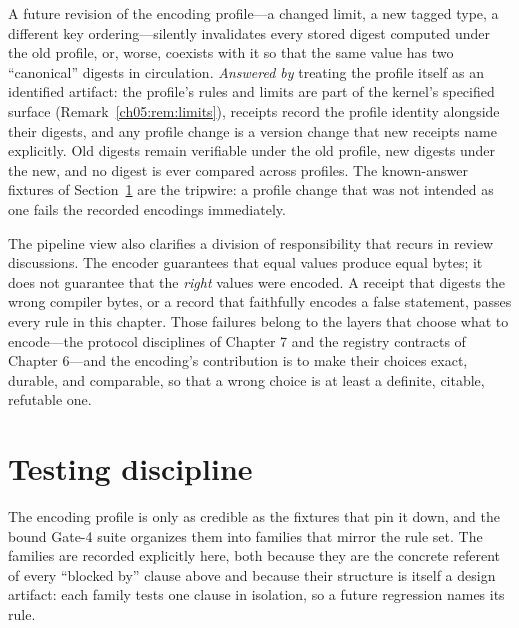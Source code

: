 \begin{threat}\label{ch05:threat:drift}
A future revision of the encoding profile---a changed limit, a new
tagged type, a different key ordering---silently invalidates every
stored digest computed under the old profile, or, worse, coexists with
it so that the same value has two ``canonical'' digests in circulation.
\emph{Answered by} treating the profile itself as an identified
artifact: the profile's rules and limits are part of the kernel's
specified surface (Remark~\ref{ch05:rem:limits}), receipts record the
profile identity alongside their digests, and any profile change is a
version change that new receipts name explicitly. Old digests remain
verifiable under the old profile, new digests under the new, and no
digest is ever compared across profiles. The known-answer fixtures of
Section~\ref{ch05:testing} are the tripwire: a profile change that was
not intended as one fails the recorded encodings immediately.
\end{threat}

The pipeline view also clarifies a division of responsibility that
recurs in review discussions. The encoder guarantees that equal values
produce equal bytes; it does not guarantee that the \emph{right} values
were encoded. A receipt that digests the wrong compiler bytes, or a
record that faithfully encodes a false statement, passes every rule in
this chapter. Those failures belong to the layers that choose what to
encode---the protocol disciplines of Chapter 7 and the registry
contracts of Chapter 6---and the encoding's contribution is to make
their choices exact, durable, and comparable, so that a wrong choice is
at least a definite, citable, refutable one.

\section{Testing discipline}\label{ch05:testing}

The encoding profile is only as credible as the fixtures that pin it
down, and the bound Gate-4 suite organizes them into families that
mirror the rule set. The families are recorded explicitly here,
both because they are the concrete referent of every ``blocked by''
clause above and because their structure is itself a design artifact:
each family tests one clause in isolation, so a future regression names
its rule.

